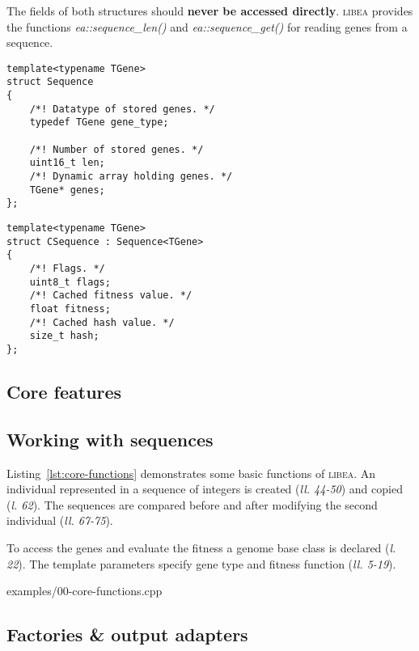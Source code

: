 \documentclass[a4paper]{article}
\begin{document}
The fields of both structures should \textbf{never be accessed directly}. \textsc{libea} provides the functions \textit{ea::sequence\_len()} and \textit{ea::sequence\_get()} for reading genes from a sequence.

\begin{lstlisting}[caption=Sequence template declaration, label=lst:sequence]
template<typename TGene>
struct Sequence
{
	/*! Datatype of stored genes. */
	typedef TGene gene_type;

	/*! Number of stored genes. */
	uint16_t len;
	/*! Dynamic array holding genes. */
	TGene* genes;
};
\end{lstlisting}

\begin{lstlisting}[caption=CSequence template declaration, label=lst:csequence]
template<typename TGene>
struct CSequence : Sequence<TGene>
{
	/*! Flags. */
	uint8_t flags;
	/*! Cached fitness value. */
	float fitness;
	/*! Cached hash value. */
	size_t hash;
};
\end{lstlisting}

\subsection{Core features}

\subsection{Working with sequences}

Listing~\ref{lst:core-functions} demonstrates some basic functions of \textsc{libea}. An individual represented in a sequence of integers is created (\textit{ll. 44-50}) and copied (\textit{l. 62}). The sequences are compared before and after modifying the second individual (\textit{ll. 67-75}).

To access the genes and evaluate the fitness a genome base class is declared (\textit{l. 22}). The template parameters specify gene type and fitness function (\textit{ll. 5-19}).

\begin{lstinputlisting}[caption=core functions,label=lst:core-functions]{examples/00-core-functions.cpp}
\end{lstinputlisting}

\subsection{Factories \& output adapters}
\end{document}
